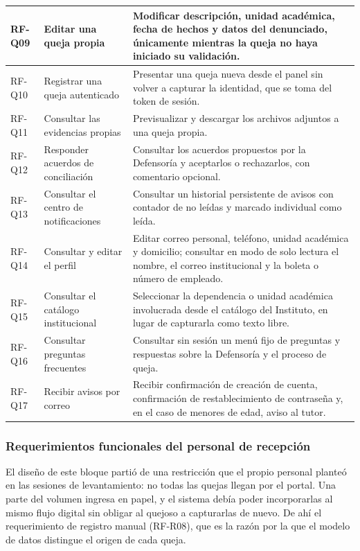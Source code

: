 \begin{longtable}{|p{1.5cm}|p{3.6cm}|p{9.0cm}|}
		RF-Q09 & Editar una queja propia & Modificar descripción, unidad académica, fecha de hechos
		y datos del denunciado, únicamente mientras la queja no haya iniciado su validación.
		\\ \hline
	
		RF-Q10 & Registrar una queja autenticado & Presentar una queja nueva desde el panel sin
		volver a capturar la identidad, que se toma del token de sesión. \\ \hline
	
		RF-Q11 & Consultar las evidencias propias & Previsualizar y descargar los archivos adjuntos
		a una queja propia. \\ \hline
	
		RF-Q12 & Responder acuerdos de conciliación & Consultar los acuerdos propuestos por la
		Defensoría y aceptarlos o rechazarlos, con comentario opcional. \\ \hline
	
		RF-Q13 & Consultar el centro de notificaciones & Consultar un historial persistente de
		avisos con contador de no leídas y marcado individual como leída. \\ \hline
	
		RF-Q14 & Consultar y editar el perfil & Editar correo personal, teléfono, unidad académica y
		domicilio; consultar en modo de solo lectura el nombre, el correo institucional y la boleta o
		número de empleado. \\ \hline
	
		RF-Q15 & Consultar el catálogo institucional & Seleccionar la dependencia o unidad académica
		involucrada desde el catálogo del Instituto, en lugar de capturarla como texto libre.
		\\ \hline
	
		RF-Q16 & Consultar preguntas frecuentes & Consultar sin sesión un menú fijo de preguntas y
		respuestas sobre la Defensoría y el proceso de queja. \\ \hline
	
		RF-Q17 & Recibir avisos por correo & Recibir confirmación de creación de cuenta, confirmación
		de restablecimiento de contraseña y, en el caso de menores de edad, aviso al tutor.
		\\ \hline
	\end{longtable}
	
	\normalsize
	
	\subsubsection{Requerimientos funcionales del personal de recepción}
	El diseño de este bloque partió de una restricción que el propio personal planteó en las
	sesiones de levantamiento: no todas las quejas llegan por el portal. Una parte del volumen
	ingresa en papel, y el sistema debía poder incorporarlas al mismo flujo digital sin obligar al
	quejoso a capturarlas de nuevo. De ahí el requerimiento de registro manual (RF-R08), que es la
	razón por la que el modelo de datos distingue el origen de cada queja.
	

